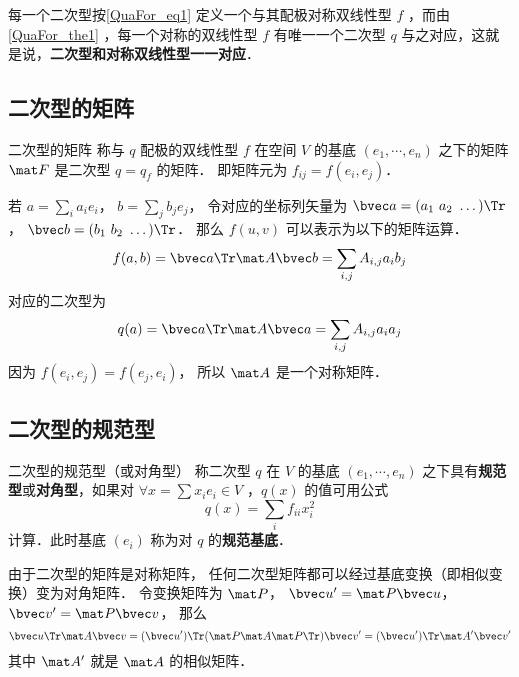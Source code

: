每一个二次型按\autoref{QuaFor_eq1} 定义一个与其配极对称双线性型 $f$ ，而由\autoref{QuaFor_the1} ，每一个对称的双线性型 $f$ 有唯一一个二次型 $q$ 与之对应，这就是说，\textbf{二次型和对称双线性型一一对应}．

\subsection{二次型的矩阵}
\begin{definition}{二次型的矩阵}
称与 $q$ 配极的双线性型 $f$ 在空间 $V$ 的基底 $(e_1,\cdots,e_n)$ 之下的矩阵 $\mat F$ 是二次型 $q=q_f$ 的矩阵． 即矩阵元为 $f_{ij} = f(e_i, e_j)$．
\end{definition}

若 $a = \sum_i a_i e_i$， $b = \sum_j b_j e_j$， 令对应的坐标列矢量为 $\bvec a = (a_1\ a_2\ \dots)\Tr$， $\bvec b = (b_1\ b_2\ \dots)\Tr$． 那么 $f(u, v)$ 可以表示为以下的矩阵运算．
\begin{equation}
f(a, b) = \bvec a\Tr \mat A \bvec b = \sum_{i,j} A_{i,j}a_i b_j
\end{equation}
对应的二次型为
\begin{equation}
q(a) = \bvec a\Tr \mat A \bvec a = \sum_{i,j} A_{i,j}a_i a_j
\end{equation}
因为 $f(e_i, e_j) = f(e_j, e_i)$， 所以 $\mat A$ 是一个对称矩阵．

\subsection{二次型的规范型}
\begin{definition}{二次型的规范型（或对角型）}\label{QuaFor_def1}
称二次型 $q$ 在 $V$ 的基底 $(e_1,\cdots,e_n)$ 之下具有\textbf{规范型}或\textbf{对角型}，如果对 $\forall x=\sum x_i e_i\in V$ ，$q(x)$ 的值可用公式
\begin{equation}
q(x)=\sum_{i}f_{ii}x_i^2
\end{equation}
计算．此时基底 $(e_i)$ 称为对 $q$ 的\textbf{规范基底}．
\end{definition}

由于二次型的矩阵是对称矩阵， 任何二次型矩阵都可以经过基底变换（即相似变换）变为对角矩阵． 令变换矩阵为 $\mat P$， $\bvec u' = \mat P \bvec u$， $\bvec v' = \mat P \bvec v$， 那么
\begin{equation}
\bvec u\Tr \mat A \bvec v = (\bvec u')\Tr (\mat P\mat A\mat P\Tr) \bvec v' = (\bvec u')\Tr \mat A' \bvec v'
\end{equation}
其中 $\mat A'$ 就是 $\mat A$ 的相似矩阵．
